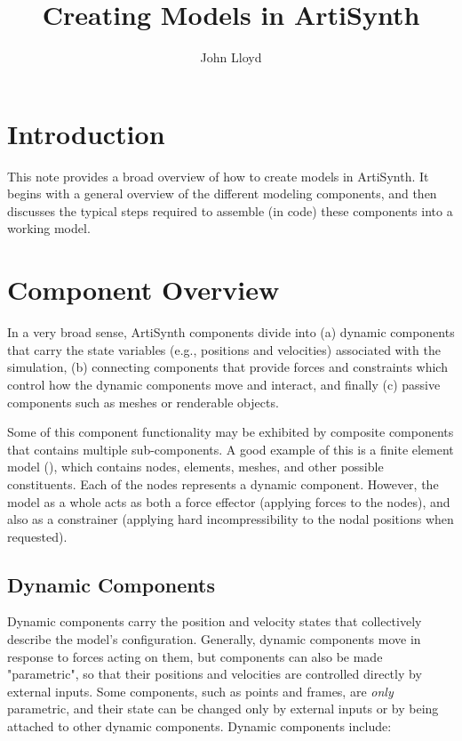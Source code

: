 \documentclass{article}
\title{Creating Models in ArtiSynth}
\author{John Lloyd}
\date{}
\def\fem{artisynth.core.femmodels}
\begin{document}

\maketitle




\section{Introduction}

This note provides a broad overview of
how to create models in ArtiSynth. It begins with a general overview
of the different modeling components, and then discusses the typical steps
required to assemble (in code) these components into a working model.

\section{Component Overview}

In a very broad sense, ArtiSynth components divide into (a) dynamic
components that carry the state variables (e.g., positions and
velocities) associated with the simulation, (b) connecting components
that provide forces and constraints which control how the dynamic
components move and interact, and finally (c) passive components such
as meshes or renderable objects.

Some of this component functionality may be exhibited by composite
components that contains multiple sub-components.  A good example of
this is a finite element model (\javaclass[\fem]{FemModel3d}), which
contains nodes, elements, meshes, and other possible
constituents. Each of the nodes represents a dynamic component.
However, the model as a whole acts as both a force effector (applying
forces to the nodes), and also as a constrainer (applying hard
incompressibility to the nodal positions when requested).

\subsection{Dynamic Components}
\label{DynamicComponents:sec}

Dynamic components carry the position and velocity states that
collectively describe the model's configuration. Generally, dynamic
components move in response to forces acting on them, but components
can also be made "parametric", so that their positions and velocities
are controlled directly by external inputs. Some components, such as
points and frames, are {\it only} parametric, and their state can be
changed only by external inputs or by being attached to other dynamic
components. Dynamic components include:
\end{document}
